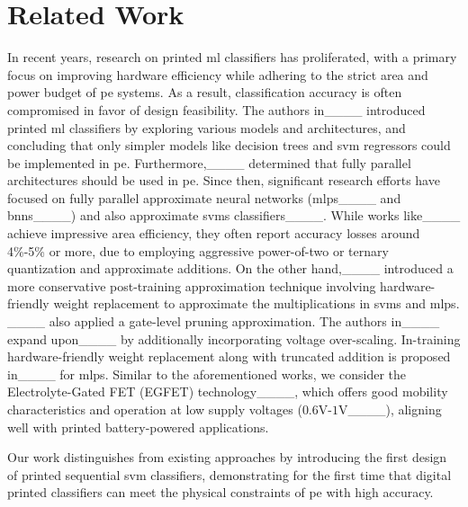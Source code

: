 \section{Related Work}
\label{sec:elated}
In recent years, research on printed \gls{ml} classifiers has proliferated, with a primary focus on improving hardware efficiency while adhering to the strict area and power budget of \gls{pe} systems.
As a result, classification accuracy is often compromised in favor of design feasibility.
The authors in____ introduced printed \gls{ml} classifiers by exploring various models and architectures, and concluding that only simpler models like decision trees and \gls{svm} regressors could be implemented in \gls{pe}.
Furthermore,____ determined that fully parallel architectures should be used in \gls{pe}. %
Since then, significant research efforts have focused on fully parallel approximate neural networks (\glspl{mlp}____ and \glspl{bnn}____) and also approximate \glspl{svm} classifiers____.
While works like____ achieve impressive area efficiency, they often report accuracy losses around 4\%-5\% or more, due to employing aggressive power-of-two or ternary quantization and approximate additions.
On the other hand,____ introduced a more conservative post-training approximation technique involving hardware-friendly weight replacement to approximate the multiplications in \glspl{svm} and \glspl{mlp}.
____ also applied a gate-level pruning approximation.
The authors in____ expand upon____ by additionally incorporating voltage over-scaling.
In-training hardware-friendly weight replacement along with truncated addition is proposed in____ for \glspl{mlp}.
Similar to the aforementioned works, we consider the Electrolyte-Gated FET (EGFET) technology____, which offers good mobility characteristics and operation at low supply voltages ($0.6$V-$1$V____), aligning well with printed battery-powered applications. 

Our work distinguishes from existing approaches by introducing the first design of printed sequential \gls{svm} classifiers, demonstrating for the first time that digital printed classifiers can meet the physical constraints of \gls{pe} with high accuracy.


